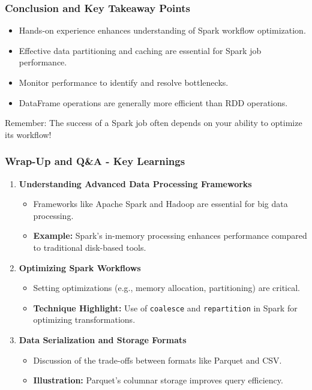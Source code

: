 \documentclass[aspectratio=169]{beamer}
\begin{document}
\begin{frame}[fragile]
    \frametitle{Conclusion and Key Takeaway Points}
    \begin{itemize}
        \item Hands-on experience enhances understanding of Spark workflow optimization.
        \item Effective data partitioning and caching are essential for Spark job performance.
        \item Monitor performance to identify and resolve bottlenecks.
        \item DataFrame operations are generally more efficient than RDD operations.
    \end{itemize}
    \begin{block}{Remember:}
        The success of a Spark job often depends on your ability to optimize its workflow!
    \end{block}
\end{frame}

\begin{frame}[fragile]
    \frametitle{Wrap-Up and Q\&A - Key Learnings}
    \begin{enumerate}
        \item \textbf{Understanding Advanced Data Processing Frameworks}
        \begin{itemize}
            \item Frameworks like Apache Spark and Hadoop are essential for big data processing.
            \item \textbf{Example:} Spark’s in-memory processing enhances performance compared to traditional disk-based tools.
        \end{itemize}
        
        \item \textbf{Optimizing Spark Workflows}
        \begin{itemize}
            \item Setting optimizations (e.g., memory allocation, partitioning) are critical.
            \item \textbf{Technique Highlight:} Use of \texttt{coalesce} and \texttt{repartition} in Spark for optimizing transformations.
        \end{itemize}
        
        \item \textbf{Data Serialization and Storage Formats}
        \begin{itemize}
            \item Discussion of the trade-offs between formats like Parquet and CSV.
            \item \textbf{Illustration:} Parquet’s columnar storage improves query efficiency.
        \end{itemize}
    \end{enumerate}
\end{frame}
\end{document}
